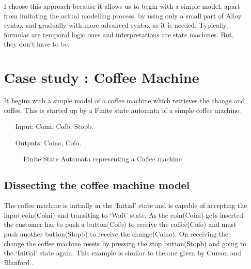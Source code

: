 \documentclass[a4paper,12pt]{report}
\begin{document}
I choose this approach because it allows us to begin with a simple model, apart from imitating the actual modelling process, by using only a small part of Alloy syntax and gradually with more advanced syntax as it is needed. Typically, formulas are temporal logic ones and interpretations are state machines. But, they don't have to be.

\chapter{Case study : Coffee Machine}
\label{Ex: Coffee machine}

It begins with a simple model of a coffee machine which retrieves the change and coffee. This is started up by a Finite state automata of a simple coffee machine.

\begin{itemize}
\item[Input:]Coini, Cofb, Stopb.
\item[Outputs:]Coino, Cofo.
\end{itemize}
\begin{figure}[ht!]
\centering
{}
 \caption{Finite State Automata representing a Coffee machine}
\end{figure}
\section{Dissecting the coffee machine model}
\label{dissecting coffee machine}
 The coffee machine is initially in the `Initial' state and is capable of accepting the input coin(Coini) and transiting to `Wait' state. As the coin(Coini) gets inserted the customer has to push a button(Cofb) to receive the coffee(Cofo) and must push another button(Stopb) to receive the change(Coino). On receiving the change the coffee machine resets by pressing the stop button(Stopb) and going to the `Initial' state again. This example is similar to the one given by Curson and Blanford \cite{A.Blandford2000}.
 
\end{document}

